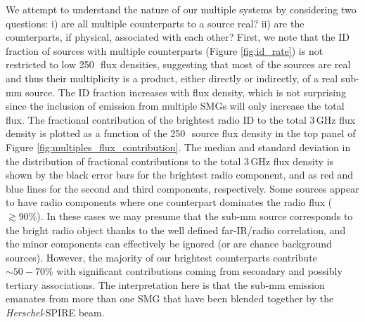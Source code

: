 We attempt to understand the nature of our multiple systems by considering two questions: i) are all multiple counterparts to a source real? ii) are the counterparts, if physical, associated with each other? First, we note that the ID fraction of sources with multiple counterparts (Figure \ref{fig:id_rate}) is not restricted to low 250\,\micron\ flux densities, suggesting that most of the sources are real and thus their multiplicity is a product, either directly or indirectly, of a real sub-mm source. The ID fraction increases with flux density, which is not surprising since the inclusion of emission from multiple SMGs will only increase the total flux. The fractional contribution of the brightest radio ID to the total 3\,GHz flux density is plotted as a function of the 250\,\micron\ source flux density in the top panel of Figure \ref{fig:multiples_flux_contribution}. The median and standard deviation in the distribution of fractional contributions to the total 3\,GHz flux density is shown by the black error bars for the brightest radio component, and as red and blue lines for the second and third components, respectively. Some sources appear to have radio components where one counterpart dominates the radio flux ($\gtrsim 90\%$). In these cases we may presume that the sub-mm source corresponds to the bright radio object thanks to the well defined far-IR/radio correlation, and the minor components can effectively be ignored (or are chance background sources). However, the majority of our brightest counterparts contribute $\sim 50 - 70\%$ with significant contributions coming from secondary and possibly tertiary associations. The interpretation here is that the sub-mm emission emanates from more than one SMG that have been blended together by the \textit{Herschel}-SPIRE beam.

